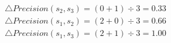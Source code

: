 \begin{small}
\begin{equation}
\begin{split}
\triangle  Precision(s_2, s_3) = ( 0 + 1) \div 3 =  0.33 \\
\triangle  Precision(s_1, s_2) = ( 2 + 0) \div 3 =  0.66 \\
\triangle  Precision(s_1, s_3) =  ( 2 + 1) \div 3 =  1.00 \\
\end{split}
\end{equation}
\end{small}

















% 


% 






